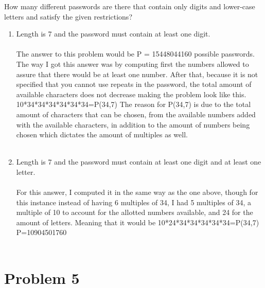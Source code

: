 How many different passwords are there that contain only digits and lower-case letters and satisfy the given restrictions?\\
      \begin{enumerate}[label=(\roman*), start=3]
    \item Length is 7 and the password must contain at least one digit.\\\\
The answer to this problem would be P = 15448044160 possible passwords. The way I got this answer was by computing first the numbers allowed to assure that there would be at least one number. After that, because it is not specified that you cannot use repeats in the password, the total amount of available characters does not decrease making the problem look like this. 10*34*34*34*34*34*34=P(34,7) The reason for P(34,7) is due to the total amount of characters that can be chosen, from the available numbers added with the available characters, in addition to the amount of numbers being chosen which dictates the amount of multiples as well.
\\\\
     \item Length is 7 and the password must contain at least one digit and at least one letter.\\\\
For this answer, I computed it in the same way as the one above, though for this instance instead of having 6 multiples of 34, I had 5 multiples of 34, a multiple of 10 to account for the allotted numbers available, and 24 for the amount of letters. Meaning that it would be 10*24*34*34*34*34*34=P(34,7) P=10904501760
\\\\
    \end{enumerate}
 
 \newpage

\section*{Problem 5}

